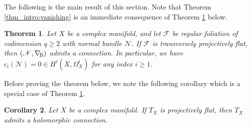 \documentclass[english,10pt]{amsart}
\newcommand{\nablaBott}{\nabla_{\! \textup{B}}}
\renewcommand{\ge}{\geqslant}
\newcommand{\cF}{\mathcal{F}}
\newcommand{\sN}{\mathscr{N}}
\newtheorem{thm}{Theorem}[section]
\newtheorem{cor}[thm]{Corollary}
\theoremstyle{definition}
\theoremstyle{remark}
\numberwithin{equation}{section}
\begin{document}
The following is the main result of this section. Note that Theorem \ref{thm_intro:vanishing} is an immediate consequence of Theorem \ref{thm:vanishing} below.

\begin{thm}\label{thm:vanishing}
Let $X$ be a complex manifold, and let $\cF$ be regular foliation of codimension $q \ge 2$ with normal bundle $\sN$. If $\cF$ is transversely projectively flat, then $(\sN,\nablaBott)$ admits a connection. In particular, we have $c_i(\sN)=0 \in H^i(X,\Omega_X^i)$ for any index $i \ge 1$.
\end{thm}

Before proving the theorem below, we note the following corollary which is a special case of Theorem \ref{thm:vanishing}.

\begin{cor}
Let $X$ be a complex manifold. If $T_X$ is projectively flat, then $T_X$ admits a holomorphic connection.
\end{cor}
\end{document}
